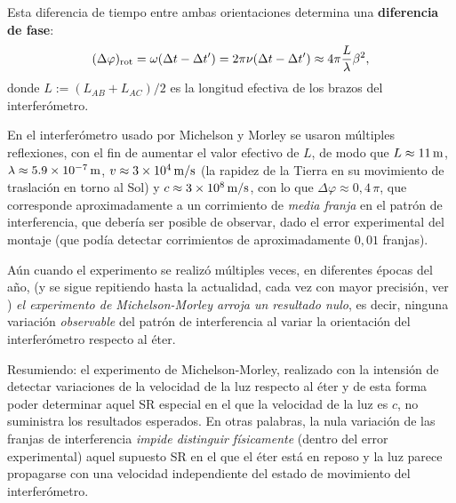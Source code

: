 Esta diferencia de tiempo entre ambas orientaciones determina una \textbf{diferencia de fase}:
\begin{equation}
(\Delta\varphi)_{\rm rot}=\omega(\Delta t-\Delta t')=2\pi\nu(\Delta t-\Delta t')\approx 4\pi\frac{L}{\lambda} \beta^2,
\end{equation}
donde $L:=(L_{AB}+L_{AC})/2$ es la longitud efectiva de los brazos del interferómetro.

En el interferómetro usado por Michelson y Morley se usaron múltiples reflexiones, con el fin de aumentar el valor efectivo de $L$, de modo que $L\approx 11\,\rm m$, $\lambda\approx 5.9\times 10^{-7}\,\rm m$, $v\approx 3\times 10^4\,\rm m/s$ (la rapidez de la Tierra en su movimiento de traslación en torno al Sol) y $c \approx 3\times 10^{8}\,\rm m/s$, con lo que $\Delta\varphi \approx 0,4\,\pi$, que corresponde aproximadamente a un corrimiento de \textit{media franja} en el patrón de interferencia, que debería ser posible de observar, dado el error experimental del montaje (que podía detectar corrimientos de aproximadamente $0,01$ franjas).

Aún cuando el experimento se realizó múltiples veces, en diferentes épocas del año, (y se sigue repitiendo hasta la actualidad, cada vez con mayor precisión, ver \cite{MHBSP03}) \textit{el experimento de Michelson-Morley arroja un resultado nulo}, es decir, ninguna variación \textit{observable} del patrón de interferencia al variar la orientación del interferómetro respecto al éter.

Resumiendo: el experimento de Michelson-Morley, realizado con la intensión de detectar variaciones de la velocidad de la luz respecto al éter y de esta forma poder determinar aquel SR especial en el que la velocidad de la luz es $c$, no suministra los resultados esperados. En otras palabras, la nula variación de las franjas de interferencia \textit{impide distinguir físicamente }(dentro del error experimental) aquel supuesto SR en el que el éter está en reposo y la luz parece propagarse con una velocidad independiente del estado de movimiento del interferómetro.

